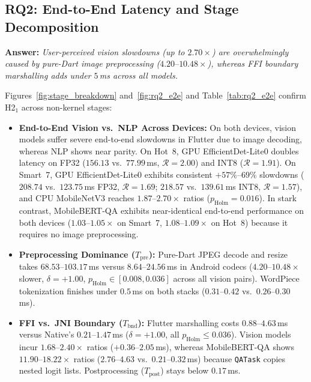 \begin{table}[t]
\caption{Pure Kernel Latency $T_{\mathrm{kernel}}$ (ms) Across Session Medians on Both Entry-Tier Devices}
\label{tab:rq1_inference}
\centering\footnotesize\renewcommand{\arraystretch}{0.92}

\end{table}

\subsection{RQ2: End-to-End Latency and Stage Decomposition}\label{subsec:rq2}
\textbf{Answer:} \textit{User-perceived vision slowdowns (up to $2.70\times$) are overwhelmingly caused by pure-Dart image preprocessing ($4.20\text{--}10.48\times$), whereas FFI boundary marshalling adds under $5$\,ms across all models.}

Figures~\ref{fig:stage_breakdown} and~\ref{fig:rq2_e2e} and Table~\ref{tab:rq2_e2e} confirm H2$_1$ across non-kernel stages:
\begin{itemize}
    \item \textbf{End-to-End Vision vs.\ NLP Across Devices:} On both devices, vision models suffer severe end-to-end slowdowns in Flutter due to image decoding, whereas NLP shows near parity. On Hot~8, GPU EfficientDet-Lite0 doubles latency on FP32 ($156.13$ vs.\ $77.99$\,ms, $\mathcal{R}=2.00$) and INT8 ($\mathcal{R}=1.91$). On Smart~7, GPU EfficientDet-Lite0 exhibits consistent $+57\%\text{--}69\%$ slowdowns ($208.74$ vs.\ $123.75$\,ms FP32, $\mathcal{R}=1.69$; $218.57$ vs.\ $139.61$\,ms INT8, $\mathcal{R}=1.57$), and CPU MobileNetV3 reaches $1.87\text{--}2.70\times$ ratios ($p_{\mathrm{Holm}}=0.016$). In stark contrast, MobileBERT-QA exhibits near-identical end-to-end performance on both devices ($1.03\text{--}1.05\times$ on Smart~7, $1.08\text{--}1.09\times$ on Hot~8) because it requires no image preprocessing.
    \item \textbf{Preprocessing Dominance ($T_{\mathrm{pre}}$):} Pure-Dart JPEG decode and resize takes $68.53\text{--}103.17$\,ms versus $8.64\text{--}24.56$\,ms in Android codecs ($4.20\text{--}10.48\times$ slower, $\delta=+1.00$, $p_{\mathrm{Holm}} \in [0.008, 0.036]$ across all vision pairs). WordPiece tokenization finishes under $0.5$\,ms on both stacks ($0.31\text{--}0.42$ vs.\ $0.26\text{--}0.30$\,ms).
    \item \textbf{FFI vs.\ JNI Boundary ($T_{\mathrm{bnd}}$):} Flutter marshalling costs $0.88\text{--}4.63$\,ms versus Native's $0.21\text{--}1.47$\,ms ($\delta=+1.00$, all $p_{\mathrm{Holm}} \le 0.036$). Vision models incur $1.68\text{--}2.40\times$ ratios ($+0.36\text{--}2.05$\,ms), whereas MobileBERT-QA shows $11.90\text{--}18.22\times$ ratios ($2.76\text{--}4.63$ vs.\ $0.21\text{--}0.32$\,ms) because \texttt{QATask} copies nested logit lists. Postprocessing ($T_{\mathrm{post}}$) stays below $0.17$\,ms.
\end{itemize}

